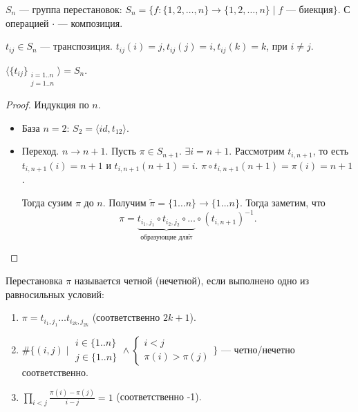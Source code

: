 \begin{definition}
    $S_n$ --- группа перестановок:  $S_n = \{ f\! :\{1, 2,\ldots, n\} \to \{1, 2,\ldots, n\} \mid f\text{ --- биекция}\}$. С операцией $\cdot$ --- композиция.
\end{definition}
\begin{definition}
    $t_{ij} \in S_n$ --- транспозиция.  $t_{ij}(i) = j, t_{ij}(j) = i, t_{ij}(k) = k$, при $i \neq j$. 
\end{definition}
\begin{statement}
    $\langle\{t_{ij}\}_{\substack{i=1..n\\j=1..n}}\rangle = S_n$.
\end{statement}
\begin{proof}
    Индукция по $n$.
\begin{itemize}
    
    \item База $n=2$:  $S_2 = \langle id, t_{12}\rangle$. 
    \item Переход. $n \to n +1$.  Пусть $\pi \in S_{n+1}$.  $\exists i = n + 1$. Рассмотрим  $t_{i, n+1}$, то есть $t_{i, n + 1}(i) = n + 1$ и $t_{i, n + 1}(n+1) = i$. $\pi \circ t_{i, n + 1}(n+1) = \pi(i) = n + 1$. 

        Тогда сузим  $\pi$ до  $n$. Получим  $\widetilde{\pi}=\{1\ldots n\} \to \{1 \ldots n\}$. Тогда заметим, что \[\pi = \underbrace{t_{i_1, j_1} \circ t_{i_2, j_2} \circ \ldots}_{\text{образующие для} \widetilde{\pi}} \circ (t_{i, n+1})^{-1}.\]
\end{itemize}
\end{proof}
\begin{definition}
    Перестановка $\pi$ называется четной (нечетной), если выполнено одно из равносильных условий:
    \begin{enumerate}
        \item $\pi = t_{i_1, j_1} \ldots t_{i_{2k}, j_{2k}}$ (соответственно $2k+1$).
        \item $\#\{(i, j) \mid \substack{i \in \{1..n\} \\ j \in \{1..n\}} \land \begin{cases} i < j \\ \pi(i) > \pi(j) \end{cases} \}$ --- четно/нечетно соответственно.
        \item  $\prod\limits_{i<j} \frac{\pi(i) - \pi(j)}{i-j} = 1$ (соответственно -1).
    \end{enumerate}

\end{definition}
